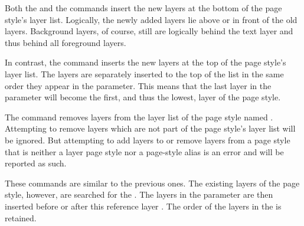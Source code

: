 Both the  and the
 commands insert the
new layers at the bottom of the page style's layer list. Logically, the newly
added layers lie above or in front of the old layers. Background layers, of
course, still are logically behind the text layer and thus behind all
foreground layers.

In contrast, the  command inserts the new layers at the top of the page style's
layer list. The layers are separately inserted to the top of the list in the
same order they appear in the  parameter. This means that
the last layer in the  parameter will become the first, and
thus the lowest, layer of the page style.

\iffalse%
The \Macro{RemoveLayersFromPageStyle} command is exactly the opposite. It
removes\textnote{remove} the specified page-style levels.%
\fi

The  command removes layers
from the layer list of the page style named .
Attempting to remove layers which are not part of the page style's layer list
will be ignored. But attempting to add layers to or remove layers from a page
style that is neither a layer page style nor a page-style alias is an error
and will be reported as such.%
\EndIndexGroup


\begin{Declaration}
\end{Declaration}
%
%
\iffalse%
These two commands are similar to the previous ones, but they take an
additional parameter,  \Parameter{reference layer name}. The layer list of
the page style named in \Parameter{page style name} is searched for this
reference layer. %
\else%
These commands are similar to the previous ones. The existing layers of the
page style, however, are searched for the . %
\fi%
The layers in the  parameter are then inserted
before or after this reference layer%
\iffalse%
in the layers of the page style%
\fi%
. The order of the layers in the  is retained.

